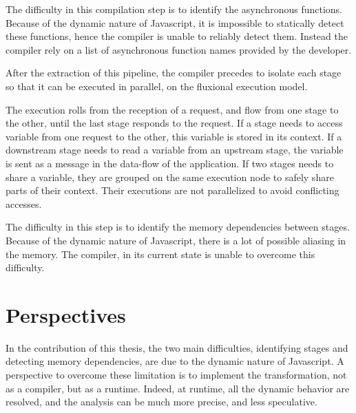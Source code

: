 The difficulty in this compilation step is to identify the asynchronous functions.
Because of the dynamic nature of Javascript, it is impossible to statically detect these functions, hence the compiler is unable to reliably detect them.
Instead the compiler rely on a list of asynchronous function names provided by the developer.


After the extraction of this pipeline, the compiler precedes to isolate each stage so that it can be executed in parallel, on the fluxional execution model.

The execution rolls from the reception of a request, and flow from one stage to the other, until the last stage responds to the request.
If a stage needs to access variable from one request to the other, this variable is stored in its context.
If a downstream stage needs to read a variable from an upstream stage, the variable is sent as a message in the data-flow of the application.
If two stages needs to share a variable, they are grouped on the same execution node to safely share parts of their context.
Their executions are not parallelized to avoid conflicting accesses.

The difficulty in this step is to identify the memory dependencies between stages.
Because of the dynamic nature of Javascript, there is a lot of possible aliasing in the memory.
The compiler, in its current state is unable to overcome this difficulty.

\section{Perspectives}

In the contribution of this thesis, the two main difficulties, identifying stages and detecting memory dependencies, are due to the dynamic nature of Javascript.
A perspective to overcome these limitation is to implement the transformation, not as a compiler, but as a runtime.
Indeed, at runtime, all the dynamic behavior are resolved, and the analysis can be much more precise, and less speculative.


